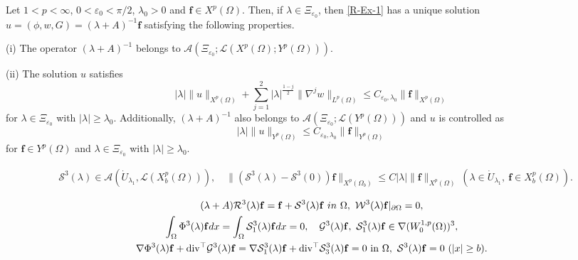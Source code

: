 \documentclass[10pt,a4paper]{amsart}
\begin{document}
\begin{prop}\label{R-Ex-Prop1}
Let $1<p<\infty$, $0<\varepsilon_0<\pi/2$, $\lambda_0>0$ and $\mathbf{f}\in X^p(\Omega)$. 
Then, if $\lambda\in \Xi_{\varepsilon_0}$, then \eqref{R-Ex-1} has a unique solution $u=(\phi,w,G)=(\lambda+A)^{-1}\mathbf{f}$
satisfying the following properties.

\vskip3mm
\noindent
(i) The operator $(\lambda+A)^{-1}$ belongs to $\mathcal{A}(\Xi_{\varepsilon_0}; \mathcal{L}(X^p(\Omega); Y^p(\Omega) ) )$.

\vskip3mm
\noindent
(ii) The solution $u$ satisfies
\begin{equation}\label{R-Ex-prop1-1}
|\lambda | \|u\|_{X^p(\Omega)}+\sum_{j=1}^2|\lambda|^{\frac{1-j}{2}} \|\nabla^j w\|_{L^p(\Omega)}\leq C_{\varepsilon_0 ,\lambda_0}\|\mathbf{f}\|_{X^p(\Omega)}
\end{equation}
for $\lambda\in \Xi_{\varepsilon_0}$ with $|\lambda|\ge \lambda_0$. Additionally, $(\lambda+A)^{-1}$ also belongs to $\mathcal{A}(\Xi_{\varepsilon_0}; \mathcal{L}(Y^p(\Omega) ) )$ and $u$ is controlled as
\begin{equation}\label{R-Ex-prop1-2}
|\lambda | \|u\|_{Y^p(\Omega)}\leq C_{\varepsilon_0 ,\lambda_0}\|\mathbf{f}\|_{Y^p(\Omega)}
\end{equation}
for $\mathbf{f}\in Y^p(\Omega)$ and $\lambda\in \Xi_{\varepsilon_0}$ with $|\lambda|\ge \lambda_0$.
\end{prop}

\begin{align}
&\mathcal{S}^3(\lambda)\in \mathcal{A}(\dot{U}_{\lambda_1}, \mathcal{L}(X_b^p(\Omega)) ), \quad \|(\mathcal{S}^3(\lambda)-\mathcal{S}^3(0))\mathbf{f}\|_{X^p(\Omega_b)} \le C|\lambda|\|\mathbf{f}\|_{X^p(\Omega)}~(\lambda\in \dot{U}_{\lambda_1},~\mathbf{f}\in X_b^p(\Omega)). \label{pr-R-Ex-Prop2-1-1}
\end{align} 

\begin{gather}
(\lambda+A)\mathcal{R}^3(\lambda)\mathbf{f}=\mathbf{f}+\mathcal{S}^{3}(\lambda)\mathbf{f}~\textrm{in}~\Omega,~\mathcal{W}^3(\lambda)\mathbf{f}|_{\partial \Omega}=0, \label{pr-R-Ex-Prop2-3} \\
\int_{\Omega} \Phi^{3}(\lambda)\mathbf{f}dx=\int_{\Omega} \mathcal{S}_1^{3}(\lambda)\mathbf{f}dx=0, \quad \mathcal{G}^{3}(\lambda)\mathbf{f},~\mathcal{S}_1^{3}(\lambda)\mathbf{f} \in\nabla (W_0^{1,p}(\Omega))^3, \notag
\\
\nabla \Phi^3(\lambda)\mathbf{f}+\mathrm{div} {}^\top \mathcal{G}^3(\lambda)\mathbf{f}=\nabla \mathcal{S}_1^3(\lambda)\mathbf{f}+\mathrm{div} {}^\top \mathcal{S}_3^3(\lambda)\mathbf{f}=0~\mathrm{in}~\Omega,~\mathcal{S}^3(\lambda)\mathbf{f}=0~(|x|\ge b). \notag
\end{gather}
\end{document}

